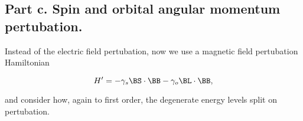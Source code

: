 
\subsection{Part c.  Spin and orbital angular momentum pertubation.}

Instead of the electric field pertubation, now we use a magnetic field pertubation Hamiltonian

\begin{equation}\label{eqn:qmTwoExamReflection:710}
H' = 
-\gamma_s \BS \cdot \BB 
-\gamma_o \BL \cdot \BB,
\end{equation}

and consider how, again to first order, the degenerate energy levels split on pertubation.

\EndArticle
